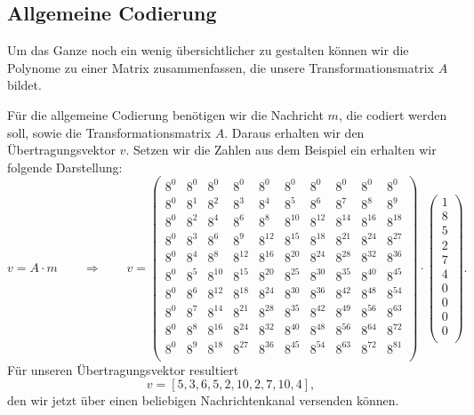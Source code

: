 \subsection{Allgemeine Codierung
	\label{reedsolomon:subsection:algCod}}
Um das Ganze noch ein wenig übersichtlicher zu gestalten können wir die Polynome zu einer Matrix zusammenfassen, die unsere Transformationsmatrix $A$ bildet.

Für die allgemeine Codierung benötigen wir die Nachricht $m$, die codiert werden soll, sowie die Transformationsmatrix $A$. Daraus erhalten wir den Übertragungsvektor $v$. Setzen wir die Zahlen aus dem Beispiel ein erhalten wir folgende Darstellung:
\[
v = A \cdot m \qquad \Rightarrow \qquad v = \begin{pmatrix}
	8^0&    8^0&    8^0&    8^0&    8^0&    8^0&    8^0&    8^0&    8^0&    8^0\\
	8^0&	8^1&	8^2&	8^3&	8^4&	8^5&	8^6&	8^7&    8^8&	8^9\\
	8^0&	8^2&	8^4&	8^6&	8^8& 8^{10}& 8^{12}& 8^{14}& 8^{16}& 8^{18}\\
	8^0&	8^3&	8^6&	8^9& 8^{12}& 8^{15}& 8^{18}& 8^{21}& 8^{24}& 8^{27}\\
	8^0&	8^4&	8^8& 8^{12}& 8^{16}& 8^{20}& 8^{24}& 8^{28}& 8^{32}& 8^{36}\\
	8^0&	8^5& 8^{10}& 8^{15}& 8^{20}& 8^{25}& 8^{30}& 8^{35}& 8^{40}& 8^{45}\\
	8^0&	8^6& 8^{12}& 8^{18}& 8^{24}& 8^{30}& 8^{36}& 8^{42}& 8^{48}& 8^{54}\\
	8^0&	8^7& 8^{14}& 8^{21}& 8^{28}& 8^{35}& 8^{42}& 8^{49}& 8^{56}& 8^{63}\\
	8^0&	8^8& 8^{16}& 8^{24}& 8^{32}& 8^{40}& 8^{48}& 8^{56}& 8^{64}& 8^{72}\\
	8^0&	8^9& 8^{18}& 8^{27}& 8^{36}& 8^{45}& 8^{54}& 8^{63}& 8^{72}& 8^{81}\\
\end{pmatrix}
\cdot
\begin{pmatrix}
	1 \\ 8 \\ 5 \\ 2 \\ 7 \\ 4 \\ 0 \\ 0 \\ 0 \\ 0 \\
\end{pmatrix}
.
\]
Für unseren Übertragungsvektor resultiert
\[
v = [5,3,6,5,2,10,2,7,10,4],
\]
den wir jetzt über einen beliebigen Nachrichtenkanal versenden können.
